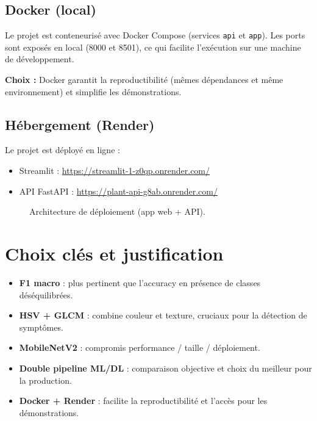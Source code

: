 \documentclass[12pt,a4paper]{article}
\begin{document}
\subsection*{Docker (local)}
Le projet est conteneuris\'e avec Docker Compose (services \texttt{api} et \texttt{app}). Les ports sont expos\'es en local (8000 et 8501), ce qui facilite l'ex\'ecution sur une machine de d\'eveloppement.

\textbf{Choix :} Docker garantit la reproductibilit\'e (m\^emes d\'ependances et m\^eme environnement) et simplifie les d\'emonstrations.

\subsection*{H\'ebergement (Render)}
Le projet est d\'eploy\'e en ligne :
\begin{itemize}[leftmargin=*]
    \item Streamlit : \url{https://streamlit-1-z0qp.onrender.com/}
    \item API FastAPI : \url{https://plant-api-g8ab.onrender.com/}
\end{itemize}

\begin{figure}[h!]
\centering
{}
\caption{Architecture de d\'eploiement (app web + API).}
\end{figure}

\section{Choix cl\'es et justification}
\begin{itemize}[leftmargin=*]
    \item \textbf{F1 macro} : plus pertinent que l'accuracy en pr\'esence de classes d\'es\'equilibr\'ees.
    \item \textbf{HSV + GLCM} : combine couleur et texture, cruciaux pour la d\'etection de sympt\^omes.
    \item \textbf{MobileNetV2} : compromis performance / taille / d\'eploiement.
    \item \textbf{Double pipeline ML/DL} : comparaison objective et choix du meilleur pour la production.
    \item \textbf{Docker + Render} : facilite la reproductibilit\'e et l'acc\`es pour les d\'emonstrations.
\end{itemize}
\end{document}
